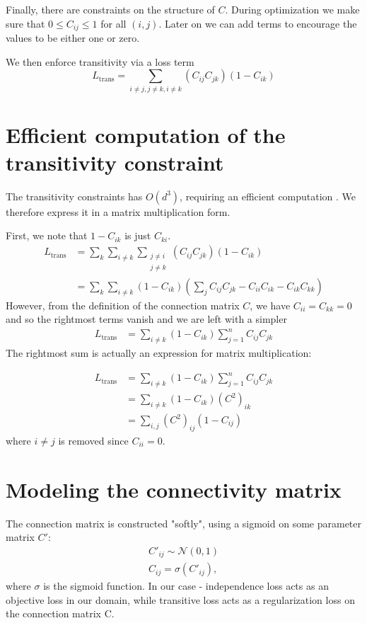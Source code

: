\documentclass{article}
\begin{document}
	Finally, there are constraints on the structure of $C$.
	During optimization we make sure that $0 \leq C_{ij} \leq 1$ for all $(i,j)$.
	Later on we can add terms to encourage the values to be either one or zero.
	
	We then enforce transitivity via a loss term
	$$L_\text{trans} = \sum_{i\neq j, j\neq k, i\neq k} (C_{ij}C_{jk})(1-C_{ik})$$
	
	\section{Efficient computation of the transitivity constraint}
	
	The transitivity constraints has $O(d^3)$, requiring an efficient computation
	. We therefore express it in a matrix multiplication form.
	
	First, we note that $1 - C_{ik}$ is just $C_{ki}$.
	\begin{align*}
	L_{\text{trans}} & =
	\sum_k
	\sum_{i \ne k}
	\sum_{\substack{j \ne i \\ j \ne k}} (C_{ij}C_{jk})(1-C_{ik})\\
	& =
	\sum_k
	\sum_{i \ne k}(1 - C_{ik}) \left(
	\sum_{j} C_{ij} C_{jk} - C_{ii}C_{ik} - C_{ik}C_{kk} 
	\right)
	\end{align*}
	However, from the definition of the connection matrix $C$, we have $C_{ii} = C_{kk} = 0$ and so the rightmost terms vanish and we are left with a simpler
	\begin{align*}
	L_{\text{trans}} & =
	\sum_{i \ne k} (1 - C_{ik})
	\sum_{j=1}^n C_{ij} C_{jk}
	\end{align*}
	The rightmost sum is actually an expression for matrix multiplication:
	
	\begin{align*}
	L_{\text{trans}} & =
	\sum_{i \ne k} (1 - C_{ik})
	\sum_{j=1}^n C_{ij} C_{jk} \\
	& =
	\sum_{i \ne k} (1 - C_{ik})
	(C^2)_{ik} \\
	& =
	\sum_{i, j} (C^2)_{ij} (1-C_{ij})
	\end{align*}
	where $i \ne j$ is removed since $C_{ii} = 0$.
	
	\section{Modeling the connectivity matrix}
	
	The connection matrix is constructed "softly", using a sigmoid on some parameter matrix $C'$:
	\begin{gather*}
	C'_{ij} \sim \mathcal{N}(0, 1) \\
	C_{ij} = \sigma(C'_{ij}), 
	\end{gather*}
	where $\sigma$ is the sigmoid function.
	In our case - independence loss acts as an objective loss in our domain, while transitive loss acts as a regularization loss on the connection matrix C.
	
\end{document}
